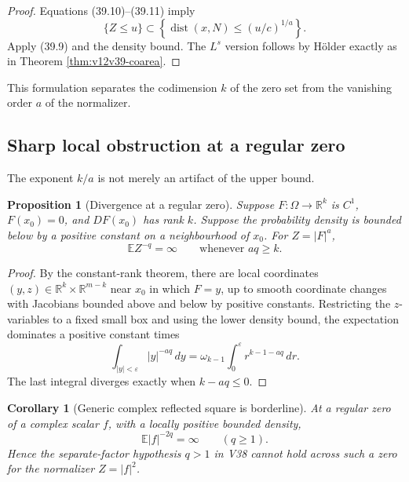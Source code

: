 \documentclass[11pt]{article}
\newtheorem{proposition}[theorem]{Proposition}
\newtheorem{corollary}[theorem]{Corollary}
\theoremstyle{remark}
\begin{document}
\begin{proof}
Equations (39.10)--(39.11) imply
\[
 \{Z\leq u\}
 \subset
 \left\{
 \operatorname{dist}(x,N)\leq(u/c)^{1/a}
 \right\}.
\]
Apply (39.9) and the density bound.  The \(L^s\) version follows by
H\"older exactly as in Theorem \ref{thm:v12v39-coarea}.
\end{proof}

This formulation separates the codimension \(k\) of the zero set
from the vanishing order \(a\) of the normalizer.

\subsection{Sharp local obstruction at a regular zero}

The exponent \(k/a\) is not merely an artifact of the upper bound.

\begin{proposition}[Divergence at a regular zero]
\label{prop:v12v39-divergence}
Suppose \(F:\Omega\to\mathbb R^k\) is \(C^1\), \(F(x_0)=0\), and
\(DF(x_0)\) has rank \(k\).  Suppose the probability density is
bounded below by a positive constant on a neighbourhood of \(x_0\).
For \(Z=|F|^a\),
\begin{equation}
                         \mathbb E Z^{-q}=\infty
 \qquad\text{whenever }aq\geq k.                 \tag{39.13}
\end{equation}
\end{proposition}

\begin{proof}
By the constant-rank theorem, there are local coordinates
\((y,z)\in\mathbb R^k\times\mathbb R^{m-k}\) near \(x_0\) in which
\(F=y\), up to smooth coordinate changes with Jacobians bounded above
and below by positive constants.  Restricting the \(z\)-variables to
a fixed small box and using the lower density bound, the expectation
dominates a positive constant times
\[
 \int_{|y|<\varepsilon}|y|^{-aq}\,dy
 =
 \omega_{k-1}
 \int_0^\varepsilon r^{k-1-aq}\,dr.
\]
The last integral diverges exactly when \(k-aq\leq0\).
\end{proof}

\begin{corollary}[Generic complex reflected square is borderline]
\label{cor:v12v39-reflected-square}
At a regular zero of a complex scalar \(f\), with a locally positive
bounded density,
\[
                         \mathbb E|f|^{-2q}=\infty
 \qquad(q\geq1).                                  \tag{39.14}
\]
Hence the separate-factor hypothesis \(q>1\) in V38 cannot hold
across such a zero for the normalizer \(Z=|f|^2\).
\end{corollary}
\end{document}
